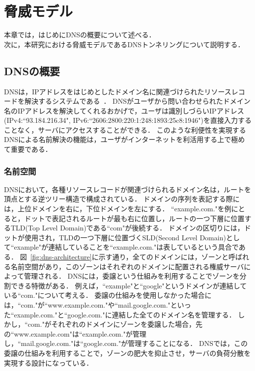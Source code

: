 \section{脅威モデル}
\label{sec:dns-tunneling}
本章では，はじめにDNSの概要について述べる．\\
次に，本研究における脅威モデルであるDNSトンネリングについて説明する．

\subsection{DNSの概要}
\label{sec:dns-protocol}

DNSは，IPアドレスをはじめとしたドメイン名に関連づけられたリソースレコードを解決するシステムである~\cite{rfc1034, rfc1035}．
DNSがユーザから問い合わせられたドメイン名のIPアドレスを解決してくれるおかげで，ユーザは識別しづらいIPアドレス(IPv4:``93.184.216.34", IPv6:``2606:2800:220:1:248:1893:25c8:1946")を直接入力することなく，サーバにアクセスすることができる．
このような利便性を実現するDNSによる名前解決の機能は，ユーザがインターネットを利活用する上で極めて重要である．

\subsubsection{名前空間}
DNSにおいて，各種リソースレコードが関連づけられるドメイン名は，ルートを頂点とする逆ツリー構造で構成されている．
ドメインの序列を表記する際には，上位ドメインを右に，下位ドメインを左にする．
``example.com."を例にとると，ドットで表記されるルートが最も右に位置し，ルートの一つ下層に位置するTLD(Top Level Domain)である``com"が後続する．
ドメインの区切りには，ドットが使用され，TLDの一つ下層に位置づくSLD(Second Level Domain)として``example"が連結していることを``example.com."は表しているという具合である．
図~\ref{fig:dns-architecture}に示す通り，全てのドメインには，ゾーンと呼ばれる名前空間があり，このゾーンはそれぞれのドメインに配置される権威サーバによって管理される．
DNSには，委譲という仕組みを利用することでゾーンを分割できる特徴がある．
例えば，``example"と``google"というドメインが連結している``com."について考える．
委譲の仕組みを使用しなかった場合には，``com."が``www.example.com."や``mail.google.com."といった``example.com."と``google.com."に連結した全てのドメイン名を管理する．
しかし，``com."がそれぞれのドメインにゾーンを委譲した場合，先の``www.example.com"は``example.com."が管理し，``mail.google.com."は``google.com."が管理することになる．
DNSでは，この委譲の仕組みを利用することで，ゾーンの肥大を抑止させ，サーバの負荷分散を実現する設計になっている．

